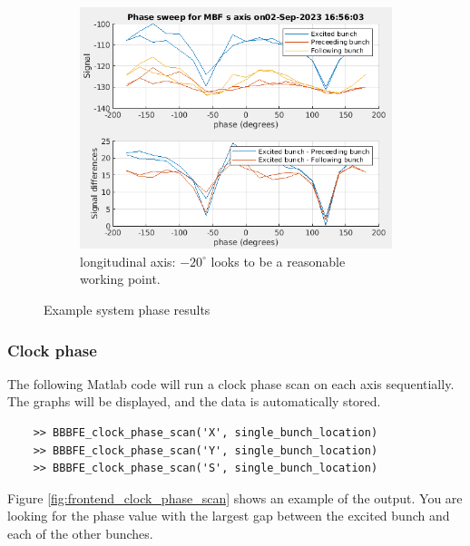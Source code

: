 \documentclass{report}
\begin{document}
\begin{figure}[hbt]
    \begin{subfigure}[b]{0.45\textwidth}
        \includegraphics[width=\textwidth]{vlr_system_phase_scan_s.png}
        \caption{longitudinal axis: $-20^\circ$ looks to be a reasonable working point.}
        \label{fig:frontend_system_phase_scan_z}
    \end{subfigure}
    \caption{Example system phase results}
    \label{fig:frontend_system_phase_scan}
\end{figure}

\subsubsection{Clock phase} 
The following Matlab code will run a clock phase scan on each axis sequentially. The graphs will be displayed, and the data is automatically stored. 

\begin{verbatim}
    >> BBBFE_clock_phase_scan('X', single_bunch_location)
    >> BBBFE_clock_phase_scan('Y', single_bunch_location)
    >> BBBFE_clock_phase_scan('S', single_bunch_location)
\end{verbatim}
Figure \ref{fig:frontend_clock_phase_scan} shows an example of the output. You are looking for the phase value with the largest gap between the excited bunch and each of the other bunches. 
\end{document}
